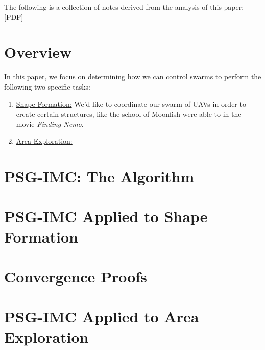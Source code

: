 \documentclass[11pt]{article}
\begin{document}
\setcounter{MaxMatrixCols}{20}
\setlength\parindent{0pt}

The following is a collection of notes derived from the analysis of this paper: [PDF]

\section*{Overview}
In this paper, we focus on determining how we can control swarms to perform the following two specific tasks:
\begin{enumerate}
\item \underline{Shape Formation:} We'd like to coordinate our swarm of UAVs in order to create certain structures, like the school of Moonfish were able to in the movie \textit{Finding Nemo}.

\item \underline{Area Exploration:}
\end{enumerate}

\section*{PSG-IMC: The Algorithm}

\section*{PSG-IMC Applied to Shape Formation}

\section*{Convergence Proofs}

\section*{PSG-IMC Applied to Area Exploration}
\end{document}
